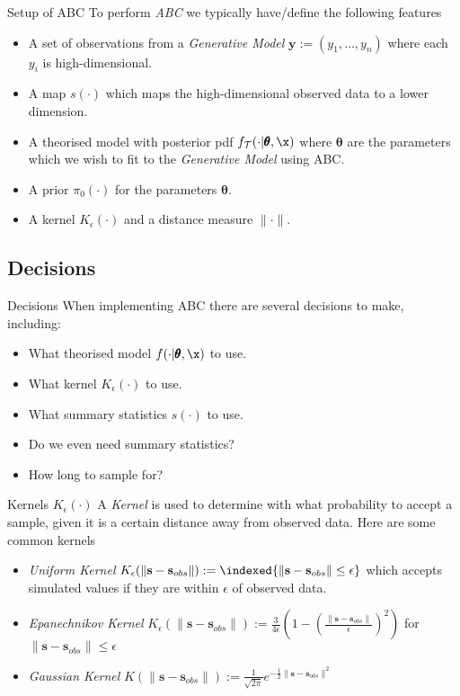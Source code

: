 \documentclass[11pt,a4paper]{article}
\begin{document}
  \begin{proposition}{Setup of ABC}
    To perform \textit{ABC} we typically have/define the following features
    \begin{itemize}
      \item A set of observations from a \textit{Generative Model} $\mathbf{y}:=(y_1,\dots,y_n)$ where each $y_i$ is high-dimensional.
      \item A map $s(\cdot)$ which maps the high-dimensional observed data to a lower dimension.
      \item A theorised model with posterior pdf $f_\mathcal{T}(\cdot|\pmb\theta,\x)$ where $\pmb\theta$ are the parameters which we wish to fit to the \textit{Generative Model} using ABC.
      \item A prior $\pi_0(\cdot)$ for the parameters $\pmb\theta$.
      \item A kernel $K_\epsilon(\cdot)$ and a distance measure $\|\cdot\|$.
    \end{itemize}
  \end{proposition}

\subsection{Decisions}

  \begin{remark}{Decisions}
    When implementing ABC there are several decisions to make, including:
    \begin{itemize}
      \item What theorised model $f(\cdot|\pmb\theta,\x)$ to use.
      \item What kernel $K_\epsilon(\cdot)$ to use.
      \item What summary statistics $s(\cdot)$ to use.
      \item Do we even need summary statistics?
      \item How long to sample for?
    \end{itemize}
  \end{remark}

  \begin{proposition}{Kernels $K_\epsilon(\cdot)$}
    A \textit{Kernel} is used to determine with what probability to accept a sample, given it is a certain distance away from observed data. Here are some common kernels
    \begin{itemize}
      \item \textit{Uniform Kernel} $K_\epsilon(\|\mathbf{s}-\mathbf{s}_{obs}\|):=\indexed\{\|\mathbf{s}-\mathbf{s}_{obs}\|\leq\epsilon\}$ which accepts simulated values if they are within $\epsilon$ of observed data.
      \item \textit{Epanechnikov Kernel} $K_\epsilon(\|\mathbf{s}-\mathbf{s}_{obs}\|):=\frac3{4\epsilon}\left(1-\left(\frac{\|\mathbf{s}-\mathbf{s}_{obs}\|}\epsilon\right)^2\right)$ for $\|\mathbf{s}-\mathbf{s}_{obs}\|\leq\epsilon$
      \item \textit{Gaussian Kernel} $K(\|\mathbf{s}-\mathbf{s}_{obs}\|):=\frac1{\sqrt{2\pi}}e^{-\frac12\|\mathbf{s}-\mathbf{s}_{obs}\|^2}$
    \end{itemize}
  \end{proposition}
\end{document}
